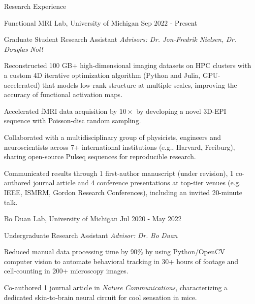 \documentclass{resume}
\begin{document}
\begin{rSection}{Research Experience}
    \begin{rSubsection}{Functional MRI Lab}{, University of Michigan \hfill {Sep 2022 - Present}}
    	\item {Graduate Student Research Assistant \hfill \textit{Advisors: Dr. Jon-Fredrik Nielsen, Dr. Douglas Noll}}
    	\begin{rSubsubsection}
            \item Reconstructed 100 GB+ high-dimensional imaging datasets on HPC clusters with a custom 4D iterative optimization algorithm (Python and Julia, GPU-accelerated) that models low-rank structure at multiple scales, improving the accuracy of functional activation maps.
            \item Accelerated fMRI data acquisition by $10\times$ by developing a novel 3D-EPI sequence with Poisson-disc random sampling.
            \item Collaborated with a multidisciplinary group of physicists, engineers and neuroscientists across 7+ international institutions (e.g., Harvard, Freiburg), sharing open-source Pulseq sequences for reproducible research.
            \item Communicated results through 1 first-author manuscript (under revision), 1 co-authored journal article and 4 conference presentations at top-tier venues (e.g. IEEE, ISMRM, Gordon Research Conferences), including an invited 20-minute talk.
    	\end{rSubsubsection}
	\end{rSubsection}

    \begin{rSubsection}{Bo Duan Lab}{, University of Michigan \hfill {Jul 2020 - May 2022}}
	\item {Undergraduate Research Assistant \hfill \textit{Advisor: Dr. Bo Duan}}
	\begin{rSubsubsection}
        \item Reduced manual data processing time by 90\% by using Python/OpenCV computer vision to automate behavioral tracking in 30+ hours of footage and cell-counting in 200+ microscopy images.
        \item Co-authored 1 journal article in \textit{Nature Communications}, characterizing a dedicated skin-to-brain neural circuit for cool sensation in mice.
	\end{rSubsubsection}
    \end{rSubsection}
\end{rSection}
\end{document}
